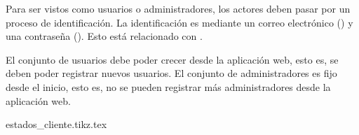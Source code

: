 {
  Para ser vistos como usuarios o administradores, los actores deben
  pasar por un proceso de identificación. La identificación es mediante
  un correo electrónico () y una
  contraseña (). Esto está relacionado
  con .
}

{
  El conjunto de usuarios debe poder crecer desde la aplicación web, esto es,
  se deben poder registrar nuevos usuarios. El conjunto de administradores es
  fijo desde el inicio, esto es, no se pueden registrar más administradores
  desde la aplicación web.
}

\begin{sidewaysfigure}
  \begin{center}
    {estados_cliente.tikz.tex}
    \caption{Diagrama de estados de un cliente.}
    \label{estados_cliente}
  \end{center}
\end{sidewaysfigure}

